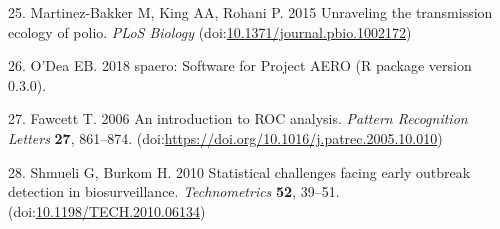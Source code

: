\documentclass[3p]{elsarticle} %
\begin{document}
\leavevmode\hypertarget{ref-Martinez-Bakker2015}{}%
25. Martinez-Bakker M, King AA, Rohani P. 2015 Unraveling the
transmission ecology of polio. \emph{PLoS Biology}
(doi:\href{https://doi.org/10.1371/journal.pbio.1002172}{10.1371/journal.pbio.1002172})

\leavevmode\hypertarget{ref-ODea2018}{}%
26. O'Dea EB. 2018 spaero: Software for Project AERO (R package version
0.3.0).

\leavevmode\hypertarget{ref-Fawcett2006}{}%
27. Fawcett T. 2006 An introduction to ROC analysis. \emph{Pattern
Recognition Letters} \textbf{27}, 861--874.
(doi:\href{https://doi.org/https://doi.org/10.1016/j.patrec.2005.10.010}{https://doi.org/10.1016/j.patrec.2005.10.010})

\leavevmode\hypertarget{ref-Shmueli2010}{}%
28. Shmueli G, Burkom H. 2010 Statistical challenges facing early
outbreak detection in biosurveillance. \emph{Technometrics} \textbf{52},
39--51.
(doi:\href{https://doi.org/10.1198/TECH.2010.06134}{10.1198/TECH.2010.06134})
\end{document}
